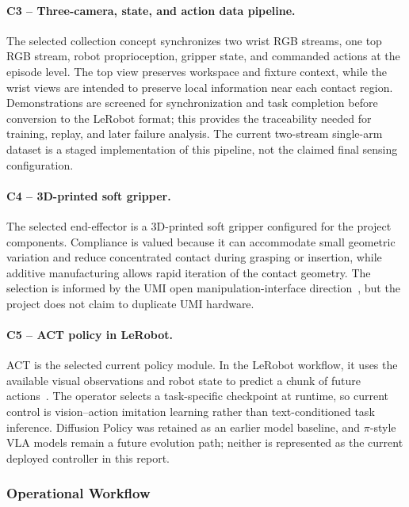\documentclass[12pt, letterpaper]{article}
\begin{document}
\paragraph{C3 -- Three-camera, state, and action data pipeline.} The selected collection concept synchronizes two wrist RGB streams, one top RGB stream, robot proprioception, gripper state, and commanded actions at the episode level. The top view preserves workspace and fixture context, while the wrist views are intended to preserve local information near each contact region. Demonstrations are screened for synchronization and task completion before conversion to the LeRobot format; this provides the traceability needed for training, replay, and later failure analysis. The current two-stream single-arm dataset is a staged implementation of this pipeline, not the claimed final sensing configuration.

\paragraph{C4 -- 3D-printed soft gripper.} The selected end-effector is a 3D-printed soft gripper configured for the project components. Compliance is valued because it can accommodate small geometric variation and reduce concentrated contact during grasping or insertion, while additive manufacturing allows rapid iteration of the contact geometry. The selection is informed by the UMI open manipulation-interface direction~\cite{umi}, but the project does not claim to duplicate UMI hardware.

\paragraph{C5 -- ACT policy in LeRobot.} ACT is the selected current policy module. In the LeRobot workflow, it uses the available visual observations and robot state to predict a chunk of future actions~\cite{act,lerobot}. The operator selects a task-specific checkpoint at runtime, so current control is vision--action imitation learning rather than text-conditioned task inference. Diffusion Policy was retained as an earlier model baseline, and $\pi$-style VLA models remain a future evolution path; neither is represented as the current deployed controller in this report.

\subsubsection{Operational Workflow}
\end{document}

